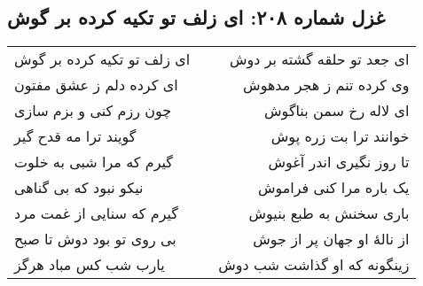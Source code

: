 \begin{center}
\section*{غزل شماره ۲۰۸: ای زلف تو تکیه کرده بر گوش}
\label{sec:208}
\begin{longtable}{l p{0.5cm} r}
ای زلف تو تکیه کرده بر گوش
&&
ای جعد تو حلقه گشته بر دوش
\\
ای کرده دلم ز عشق مفتون
&&
وی کرده تنم ز هجر مدهوش
\\
چون رزم کنی و بزم سازی
&&
ای لاله رخ سمن بناگوش
\\
گویند ترا مه قدح گیر
&&
خوانند ترا بت زره پوش
\\
گیرم که مرا شبی به خلوت
&&
تا روز نگیری اندر آغوش
\\
نیکو نبود که بی گناهی
&&
یک باره مرا کنی فراموش
\\
گیرم که سنایی از غمت مرد
&&
باری سخنش به طبع بنیوش
\\
بی روی تو بود دوش تا صبح
&&
از نالهٔ او جهان پر از جوش
\\
یارب شب کس مباد هرگز
&&
زینگونه که او گذاشت شب دوش
\\
\end{longtable}
\end{center}
